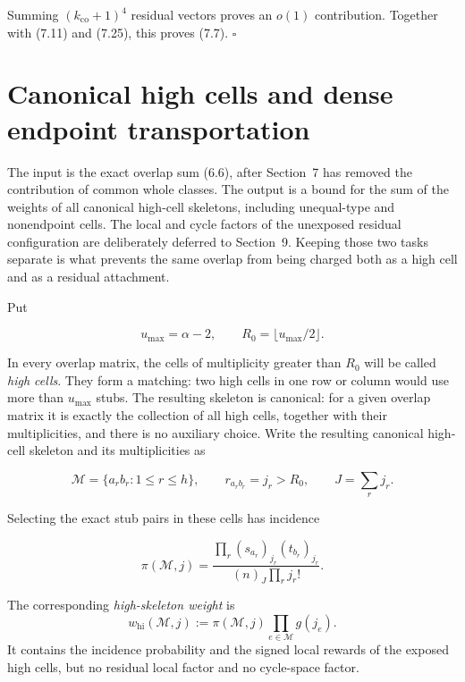 \documentclass[11pt,reqno]{amsart}
\newcommand{\displayheading}[1]{%
  \par\addvspace{0.68\baselineskip}%
  \noindent{\scshape #1.}\par\nobreak\smallskip\noindent}
\begin{document}
Summing \((k_{\mathrm{co}}+1)^4\) residual vectors proves an \(o(1)\)
contribution. Together with (7.11) and (7.25), this proves (7.7).
\(\square\)

\section{Canonical high cells and dense endpoint
transportation}\label{canonical-high-cells-and-dense-endpoint-transportation}

\displayheading{Contract for this section}
The input is the exact overlap sum (6.6), after Section~7 has removed the
contribution of common whole classes.  The output is a bound for the sum of
the weights of all canonical high-cell skeletons, including unequal-type and
nonendpoint cells.  The local and cycle factors of the unexposed residual
configuration are deliberately deferred to Section~9.  Keeping those two
tasks separate is what prevents the same overlap from being charged both as a
high cell and as a residual attachment.

Put

\[
 u_{\max}=\alpha-2,\qquad R_0=\lfloor u_{\max}/2\rfloor.                \tag{8.1}
\]

In every overlap matrix, the cells of multiplicity greater than
\(R_0\) will be called \emph{high cells}. They form a matching: two high
cells in one row or column would use more than \(u_{\max}\) stubs. The
resulting skeleton is canonical: for a given overlap matrix it is exactly
the collection of all high cells, together with their multiplicities, and
there is no auxiliary choice. Write the
resulting canonical high-cell skeleton and its multiplicities as

\[
 \mathcal M=\{a_rb_r:1\le r\le h\},\qquad
 r_{a_rb_r}=j_r>R_0,\qquad J=\sum_rj_r.                  \tag{8.2}
\]

Selecting the exact stub pairs in these cells has incidence

\[
\pi(\mathcal M,j)=
 \frac{\prod_r(s_{a_r})_{j_r}(t_{b_r})_{j_r}}
      {(n)_J\prod_rj_r!}.                                \tag{8.3}
\]

The corresponding \emph{high-skeleton weight} is
\[
 w_{\mathrm{hi}}(\mathcal M,j)
 :=\pi(\mathcal M,j)\prod_{e\in\mathcal M}g(j_e).         \tag{8.3a}
\]
It contains the incidence probability and the signed local rewards of the
exposed high cells, but no residual local factor and no cycle-space factor.
\end{document}

